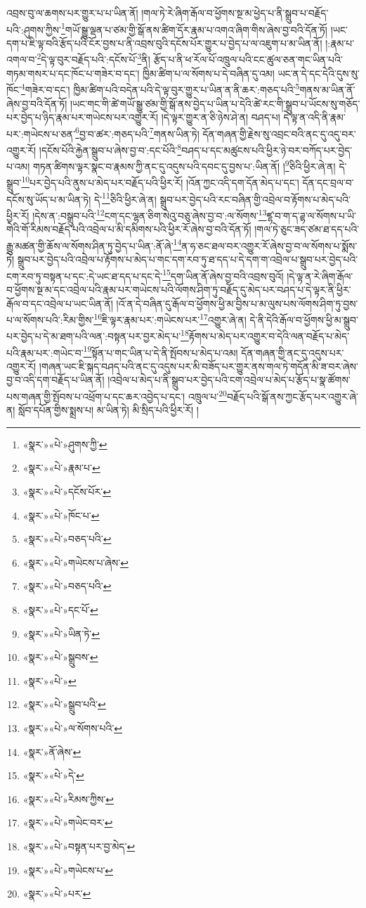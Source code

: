 འབྲས་བུ་ལ་ཆགས་པར་གྱུར་པ་པ་ཡིན་ནོ། །གལ་ཏེ་རེ་ཞིག་རྒོལ་བ་ཕྱོགས་སྔ་མ་ཕྱེད་པ་ནི་སྒྲུབ་པ་བརྗོད་པའི་:ཤུགས་ཀྱིས་\footnote{«སྣར་»«པེ་»ཤུགས་ཀྱི་}གཡོ་སྒྱུ་ལྡན་པ་ཙམ་གྱི་སྒོ་ནས་ཚིག་དོར་རྣམ་པ་འགའ་ཞིག་གིས་ཞེས་བྱ་བའི་དོན་ཏོ། །ཡང་དག་པ་ཇི་ལྟ་བའི་རྩོད་པའི་ངོར་བྱས་པ་ནི་འབྲས་བུའི་དངོས་པོར་གྱུར་པ་བྱེད་པ་ལ་འཇུག་པ་མ་ཡིན་ནོ། །:རྣམ་པ་འགལ་བ་\footnote{«སྣར་»«པེ་»རྣམ་པ་}དེ་ལྟ་བུར་བརྗོད་པའི་:དངོས་པོ་\footnote{«སྣར་»«པེ་»དངོས་པོར་}ནི། རྩོད་པ་ནི་ཕ་རོལ་པོ་འཁྲུལ་པའི་ངང་ཚུལ་ཅན་གང་ཡིན་པའི་གཏམ་གསར་པ་དང་ཁོང་པ་གཟེར་བ་དང་། ཁྱིམ་ཚིག་པ་ལ་སོགས་པ་དེ་བཞིན་དུ་འམ། ཡང་ན་དེ་དང་དེའི་དུས་སུ་ཁོང་\footnote{«སྣར་»«པེ་»ཁོང་པ་}གཟེར་བ་དང་། ཁྱིམ་ཚིག་པའི་བདེན་པའི་དེ་ལྟ་བུར་གྱུར་པ་ཡིན་ན་ནི་ཆར་:གཅད་པའི་\footnote{«སྣར་»«པེ་»བཅད་པའི་}གནས་མ་ཡིན་ནོ་ཞེས་བྱ་བའི་དོན་ཏོ། །ཡང་གང་གི་ཚེ་གཡོ་སྒྱུ་ཙམ་གྱི་སྒོ་ནས་བྱེད་པ་ཡིན་པ་དེའི་ཚེ་རང་གི་སྒྲུབ་པ་ཡོངས་སུ་གཅོད་པར་བྱེད་པ་ཉིད་རྣམ་པར་གཡེངས་པར་འགྱུར་རོ། །དེ་ལྟར་གྱུར་ན་ཅི་ཉེས་ཤེ་ན། བཤད་པ། དེ་ལྟ་ན་འདི་ནི་རྣམ་པར་:གཡེངས་པ་ཅན་\footnote{«སྣར་»«པེ་»གཡེངས་པ་ཞེས་}བྱ་བ་ཚར་:གཅད་པའི་\footnote{«སྣར་»«པེ་»བཅད་པའི་}གནས་ཡིན་ཏེ། དོན་གཞན་གྱི་རྗེས་སུ་འབྲང་བའི་ནང་དུ་འདུ་བར་འགྱུར་རོ། །དངོས་པོའི་རྐྱེན་སྒྲུབ་པ་ཞེས་བྱ་བ་:དང་པོའི་\footnote{«སྣར་»«པེ་»དང་པོ་}བཤད་པ་དང་མཚུངས་པའི་ཕྱིར་ཉེ་བར་བཀོད་པར་བྱེད་པ་འམ། གཏན་ཚིགས་ལྟར་སྣང་བ་རྣམས་ཀྱི་ནང་དུ་འདུས་པའི་དབང་དུ་བྱས་པ་:ཡིན་ནོ། །\footnote{«སྣར་»«པེ་»ཡིན་ཏེ་}ཅིའི་ཕྱིར་ཞེ་ན། དེ་སྒྲུབ་\footnote{«སྣར་»«པེ་»སྒྲུབས་}པར་བྱེད་པའི་ནུས་པ་མེད་པར་བརྗོད་པའི་ཕྱིར་རོ། །འོན་ཀྱང་འདི་དག་དོན་མེད་པ་དང་། དོན་དང་བྲལ་བ་དངོས་སུ་ཡོད་པ་མ་ཡིན་ཏེ། དེ་\footnote{«སྣར་»«པེ་»}ཅིའི་ཕྱིར་ཞེ་ན། སྒྲུབ་པར་བྱེད་པའི་རང་བཞིན་གྱི་འབྲེལ་བ་རྟོགས་པ་མེད་པའི་ཕྱིར་རོ། །དེས་ན་:བསྒྲུབ་པའི་\footnote{«སྣར་»«པེ་»སྒྲུབ་པའི་}ངག་དང་ལྷན་ཅིག་སེའུ་བཅུ་ཞེས་བྱ་བ་:ལ་སོགས་\footnote{«སྣར་»«པེ་»ལ་སོགས་པའི་}ཛྷ་བ་ག་ད་ཌྷ་ལ་སོགས་པ་ཡི་གེའི་གོ་རིམས་བརྗོད་པའི་འབྲེལ་པ་མི་དམིགས་པའི་ཕྱིར་རོ་ཞེས་བྱ་བའི་དོན་ཏོ། །གལ་ཏེ་ཅུང་ཟད་ཙམ་ཐ་དད་པའི་རྒྱུ་མཚན་གྱི་ཆོས་ལ་སོགས་ཤིན་ཏུ་བྱེད་པ་ཡིན་:ནོ་ཞེ་\footnote{«སྣར་»ནོ་ཞེས་}ན་ཧ་ཅང་ཐལ་བར་འགྱུར་རོ་ཞེས་བྱ་བ་ལ་སོགས་པ་སྨོས་ཏེ། སྒྲུབ་པར་བྱེད་པའི་འབྲེལ་པ་རྟོགས་པ་མེད་པ་གང་དག་རབ་ཏུ་ཐ་དད་པ་དེ་དག་ག་འབྲེལ་པ་སྒྲུབ་པར་བྱེད་པའི་ངག་རབ་ཏུ་བསྟན་པ་དང་:དེ་ཡང་ཐ་དད་པ་དང་དེ་\footnote{«སྣར་»«པེ་»དེ་}དག་ཡིན་ནོ་ཞེས་བྱ་བའི་འབྲས་བུའོ། །དེ་ལྟ་ན་རེ་ཞིག་རྒོལ་བ་ཕྱོགས་སྔ་མ་དང་འབྲེལ་པའི་རྣམ་པར་གཡེངས་པའི་ལོགས་ཤིག་ཏུ་བརྗོད་དུ་མེད་པར་བཤད་པ་དེ་ལྟར་ནི་ཕྱིར་རྒོལ་བ་དང་འབྲེལ་པ་ཡང་ཡིན་ནོ། །འོ་ན་དེ་བཞིན་དུ་རྒོལ་བ་ཕྱོགས་ཕྱི་མ་བྱིས་པ་མ་ལུས་པས་ལོགས་ཤིག་ཏུ་བྱས་པ་ལ་སོགས་པའི་:རིམ་གྱིས་\footnote{«སྣར་»«པེ་»རིམས་ཀྱིས་}ཇི་ལྟར་རྣམ་པར་:གཡེངས་པར་\footnote{«སྣར་»«པེ་»གཡེང་བར་}འགྱུར་ཞེ་ན། དེ་ནི་དེའི་རྒོལ་བ་ཕྱོགས་ཕྱི་མ་སྒྲུབ་པར་བྱེད་པ་དེ་མ་ཐག་པའི་ལན་:བསྟན་པར་བྱར་མེད་པ་\footnote{«སྣར་»«པེ་»བསྟན་པར་བྱ་མེད་}རྟོགས་པ་མེད་པར་འགྱུར་བ་དེའི་ལན་བརྗོད་པ་མེད་པའི་རྣམ་པར་:གཡེང་བ་\footnote{«སྣར་»«པེ་»གཡེངས་པ་}སྟོན་པ་གང་ཡིན་པ་དེ་ནི་སྤོབས་པ་མེད་པ་འམ། དོན་གཞན་གྱི་ནང་དུ་འདུས་པར་འགྱུར་རོ། །གཞན་ཡང་ཇི་སྐད་བཤད་པའི་ནང་དུ་འདུས་པར་མི་བཟོད་པར་གྱུར་ནས་གལ་ཏེ་གདོན་མི་ཟ་བར་ཞེས་བྱ་བ་འདི་དག་བརྗོད་པ་ཡིན་ནོ། །འབྲེལ་པ་མེད་པ་ནི་སྒྲུབ་པར་བྱེད་པའི་ངག་འབྲེལ་པ་མེད་པ་རྩོད་པ་སྣ་ཚོགས་པས་གཞན་གྱི་སྤོབས་པ་འཕྲོག་པ་དང་ཆར་འབྱེད་པ་དང་། འཁྲུལ་པ་\footnote{«སྣར་»«པེ་»པར་}བརྗོད་པའི་སྒོ་ནས་ཀྱང་རྩོད་པར་འགྱུར་ཞེ་ན། སློབ་དཔོན་གྱིས་སྨྲས་པ། མ་ཡིན་ཏེ། མི་སྲིད་པའི་ཕྱིར་རོ། །
